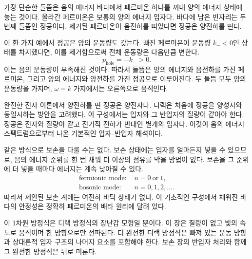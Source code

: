 가장 단순한 들뜸은 음의 에너지 바다에서 페르미온 하나를 꺼내 양의 에너지 상태에 놓는 것이다. 올라간 페르미온은 보통의 양의 에너지 입자다. 바다에 남은 빈자리는 두 번째 들뜸인 정공이다. 제거된 페르미온이 음전하를 띠었다면 정공은 양전하를 띤다.

이 한 가지 예에서 정공은 양의 운동량도 갖는다. 빠진 페르미온이 운동량 \(k_-<0\)인 상태를 차지했다면, 이를 제거함으로써 전체 운동량은 다음만큼 변한다.
\begin{equation}
p_{\mathrm{hole}}=-k_->0.
\end{equation}
이는 음의 운동량이 부족해진 것이다. 따라서 들뜸은 양의 에너지와 음전하를 가진 페르미온, 그리고 양의 에너지와 양전하를 가진 정공으로 이루어진다. 두 들뜸 모두 양의 운동량을 가지며, \(\omega=k\) 가지에서는 오른쪽으로 움직인다.

완전한 전자 이론에서 양전하를 띤 정공은 양전자다. 디랙은 처음에 정공을 양성자와 동일시하는 방안을 고려했다. 이 구성에서는 입자와 그 반입자의 질량이 같아야 한다. 정공은 전자와 질량이 같고 전기적 전하가 반대인 별개의 입자다. 이것이 음의 에너지 스펙트럼으로부터 나온 기본적인 입자--반입자 해석이다.

같은 방식으로 보손을 다룰 수는 없다. 보손 상태에는 입자를 얼마든지 넣을 수 있으므로, 음의 에너지 준위를 한 번 채워 더 이상의 점유를 막을 방법이 없다. 보손을 그 준위에 더 넣을 때마다 에너지는 계속 낮아질 수 있다.
\begin{equation}
\begin{aligned}
\text{fermionic mode: }&n=0\ \text{or}\ 1,\\
\text{bosonic mode: }&n=0,1,2,\ldots .
\end{aligned}
\end{equation}
따라서 제안된 보손 계에는 여전히 바닥 상태가 없다. 이 기초적인 구성에서 채워진 바다의 안정성은 정확히 페르미온의 배타 원리에 달려 있다.

이 1차원 방정식은 디랙 방정식의 장난감 모형일 뿐이다. 이 장은 질량이 없고 빛의 속도로 움직이며 한 방향으로만 전파된다. 더 완전한 디랙 방정식은 빠져 있는 운동 방향과 상대론적 입자 구조의 나머지 요소를 포함해야 한다. 보손 장의 반입자 처리와 함께 그 완전한 방정식은 뒤로 미룬다.
